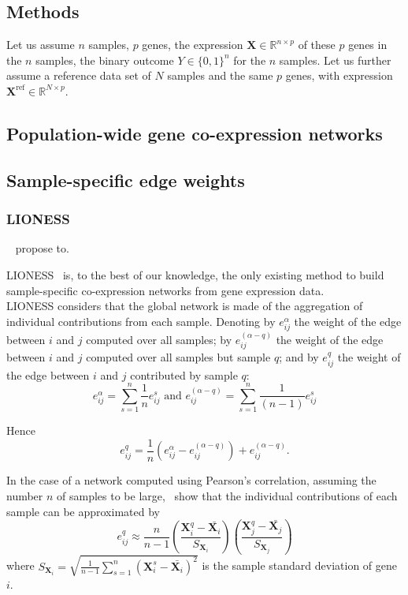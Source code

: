 \documentclass{bioinfo}
\newcommand{\xmat}{{\bm X}}
\newcommand{\xref}{{\bm X}^{\mbox{ref}}}
\begin{document}
\begin{methods}
\section{Methods}
Let us assume $n$ samples, $p$ genes, the expression $\xmat \in \mathbb{R}^{n \times p}$ of these $p$ genes in the $n$ samples, the binary outcome $Y \in \{0, 1\}^n$ for the $n$ samples.
Let us further assume a reference data set of $N$ samples and the same $p$ genes, with expression $\xref \in \mathbb{R}^{N \times p}$.





\subsection{Population-wide gene co-expression networks}

\subsection{Sample-specific edge weights}

\subsubsection{LIONESS}
~\citealp{kuijjer2015} propose to.

LIONESS~\cite{kuijjer2015} is, to the best of our knowledge, the only existing method to build sample-specific co-expression networks from gene expression data.\\

LIONESS considers that the global network is made of the aggregation of individual contributions from each sample. 
Denoting by $e_{ij}^\alpha$ the weight of the edge between $i$ and $j$ computed over all samples;
by $e_{ij}^{(\alpha - q)}$ the weight of the edge between $i$ and $j$ computed over all samples but sample $q$;
and by $e_{ij}^q$ the weight of the edge between $i$ and $j$ contributed by sample $q$:
    \[
    e_{ij}^\alpha = \sum_{s=1}^n \frac{1}{n} e_{ij}^s 
    \mbox{ and }
    e_{ij}^{(\alpha - q)} = \sum_{s=1}^n \frac{1}{(n-1)} e_{ij}^s
    \]

Hence
    \[
    e_{ij}^q = \frac{1}{n} \left(  e_{ij}^{\alpha} - e_{ij}^{(\alpha - q)} \right) + e_{ij}^{(\alpha - q)}.
    \]

In the case of a network computed using Pearson's correlation, assuming the number $n$ of samples to be large,~\cite{kuijjer2015} show that the individual contributions of each sample can be approximated by
    \[
    e_{ij}^q \approx \frac{n}{n-1} \left( \frac{\xmat_i^q - \bar {\xmat_i}}{S_{\xmat_i}} \right) 
    \left( \frac{\xmat_j^q - \bar {\xmat_j}}{S_{\xmat_j}} \right)
    \]
    where $S_{\xmat_i} = \sqrt{\frac{1}{n-1} \sum_{s=1}^n \left( \xmat_i^s - \bar{\xmat_i} \right)^2}$ is the sample standard deviation of gene $i$.




\end{methods}
\end{document}
